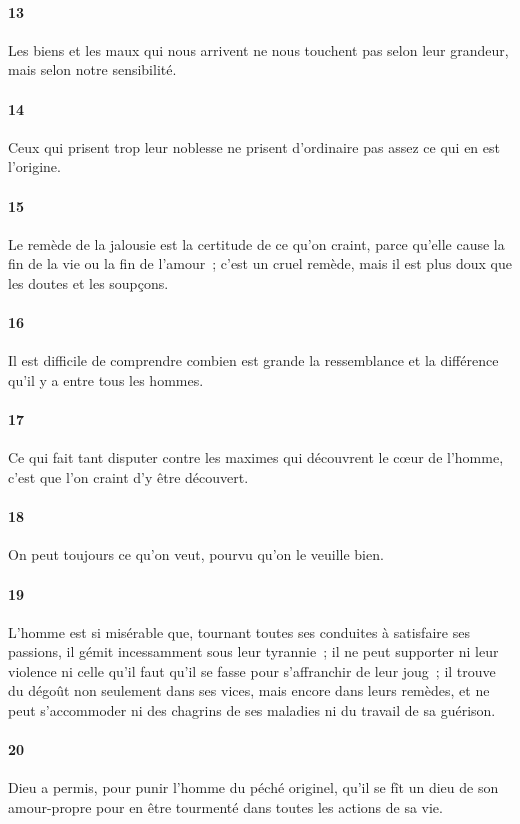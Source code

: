 \documentclass[french,twoside]{book} %
\begin{document}
\paragraph[{13}]{ \textsc{13} }
\noindent Les biens et les maux qui nous arrivent ne nous touchent pas selon leur grandeur, mais selon notre sensibilité.
\paragraph[{14}]{ \textsc{14} }
\noindent Ceux qui prisent trop leur noblesse ne prisent d’ordinaire pas assez ce qui en est l’origine.
\paragraph[{15}]{ \textsc{15} }
\noindent Le remède de la jalousie est la certitude de ce qu’on craint, parce qu’elle cause la fin de la vie ou la fin de l’amour ; c’est un cruel remède, mais il est plus doux que les doutes et les soupçons.
\paragraph[{16}]{ \textsc{16} }
\noindent Il est difficile de comprendre combien est grande la ressemblance et la différence qu’il y a entre tous les hommes.
\paragraph[{17}]{ \textsc{17} }
\noindent Ce qui fait tant disputer contre les maximes qui découvrent le cœur de l’homme, c’est que l’on craint d’y être découvert.
\paragraph[{18}]{ \textsc{18} }
\noindent On peut toujours ce qu’on veut, pourvu qu’on le veuille bien.
\paragraph[{19}]{ \textsc{19} }
\noindent L’homme est si misérable que, tournant toutes ses conduites à satisfaire ses passions, il gémit incessamment sous leur tyrannie ; il ne peut supporter ni leur violence ni celle qu’il faut qu’il se fasse pour s’affranchir de leur joug ; il trouve du dégoût non seulement dans ses vices, mais encore dans leurs remèdes, et ne peut s’accommoder ni des chagrins de ses maladies ni du travail de sa guérison.
\paragraph[{20}]{ \textsc{20} }
\noindent Dieu a permis, pour punir l’homme du péché originel, qu’il se fît un dieu de son amour-propre pour en être tourmenté dans toutes les actions de sa vie.
\end{document}
